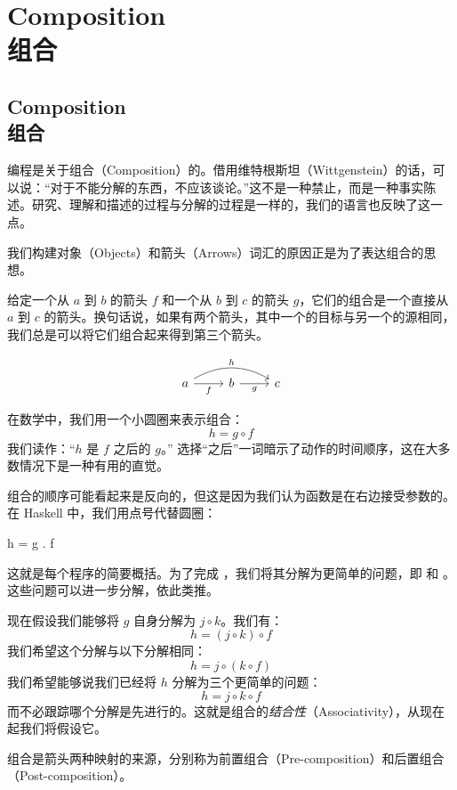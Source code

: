 \documentclass[DaoFP]{subfiles}
\begin{document}
    \setcounter{chapter}{1}
    \chapter{Composition\\组合}

    \section{Composition\\组合}

    编程是关于组合（Composition）的。借用维特根斯坦（Wittgenstein）的话，可以说：“对于不能分解的东西，不应该谈论。”这不是一种禁止，而是一种事实陈述。研究、理解和描述的过程与分解的过程是一样的，我们的语言也反映了这一点。

    我们构建对象（Objects）和箭头（Arrows）词汇的原因正是为了表达组合的思想。

    给定一个从 $a$ 到 $b$ 的箭头 $f$ 和一个从 $b$ 到 $c$ 的箭头 $g$，它们的组合是一个直接从 $a$ 到 $c$ 的箭头。换句话说，如果有两个箭头，其中一个的目标与另一个的源相同，我们总是可以将它们组合起来得到第三个箭头。

    \[
        \begin{tikzcd}
            a
            \arrow[rr, bend left, "h"]
            \arrow[r, "f"']
            & b
            \arrow[r, "g"']
            & c
        \end{tikzcd}
    \]

    在数学中，我们用一个小圆圈来表示组合：
    \[h = g \circ f\]
    我们读作：“$h$ 是 $f$ 之后的 $g$。” 选择“之后”一词暗示了动作的时间顺序，这在大多数情况下是一种有用的直觉。

    组合的顺序可能看起来是反向的，但这是因为我们认为函数是在右边接受参数的。
    在 Haskell 中，我们用点号代替圆圈：
    \begin{haskell}
        h = g . f
    \end{haskell}
    这就是每个程序的简要概括。为了完成 ，我们将其分解为更简单的问题，即  和 。这些问题可以进一步分解，依此类推。

    现在假设我们能够将 $g$ 自身分解为 $j \circ k$。我们有：
    \[h = (j \circ k) \circ f\]
    我们希望这个分解与以下分解相同：
    \[h = j \circ (k \circ f)\]
    我们希望能够说我们已经将 $h$ 分解为三个更简单的问题：
    \[h =  j \circ k \circ f\]
    而不必跟踪哪个分解是先进行的。这就是组合的\emph{结合性}（Associativity），从现在起我们将假设它。

    组合是箭头两种映射的来源，分别称为前置组合（Pre-composition）和后置组合（Post-composition）。
\end{document}
